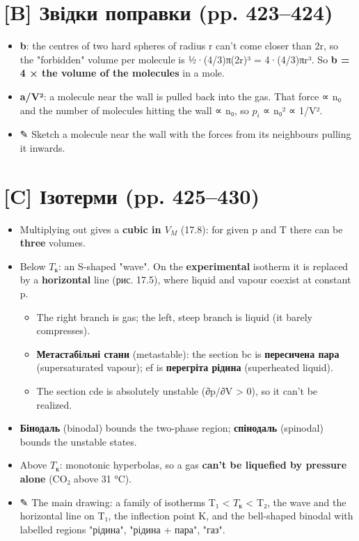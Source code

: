 \documentclass[11pt,a4paper,oneside]{book}
\newcommand{\pen}{{\sffamily\color{accent}✎}}
\begin{document}
\section*{[B] Звідки поправки (pp. 423–424)}
\begin{itemize}
\item \textbf{b}: the centres of two hard spheres of radius r can't come closer than 2r, so the "forbidden" volume per molecule is ½·(4/3)π(2r)³ = 4·(4/3)πr³. So \textbf{b = 4 × the volume of the molecules} in a mole.
\item \textbf{a/V²}: a molecule near the wall is pulled back into the gas. That force ∝ n₀ and the number of molecules hitting the wall ∝ n₀, so $p_{i}$ ∝ n₀² ∝ 1/V².
\item \pen{} Sketch a molecule near the wall with the forces from its neighbours pulling it inwards.
\end{itemize}

\section*{[C] Ізотерми (pp. 425–430)}
\begin{itemize}
\item Multiplying out gives a \textbf{cubic in $V_{M}$} (17.8): for given p and T there can be \textbf{three} volumes.
\item Below $T_{\text{к}}$: an S-shaped "wave". On the \textbf{experimental} isotherm it is replaced by a \textbf{horizontal} line (рис. 17.5), where liquid and vapour coexist at constant p.
\begin{itemize}
\item The right branch is gas; the left, steep branch is liquid (it barely compresses).
\item \textbf{Метастабільні стани} (metastable): the section bc is \textbf{пересичена пара} (supersaturated vapour); ef is \textbf{перегріта рідина} (superheated liquid).
\item The section cde is absolutely unstable (∂p/∂V > 0), so it can't be realized.
\end{itemize}
\item \textbf{Бінодаль} (binodal) bounds the two-phase region; \textbf{спінодаль} (spinodal) bounds the unstable states.
\item Above $T_{\text{к}}$: monotonic hyperbolas, so a gas \textbf{can't be liquefied by pressure alone} (CO₂ above 31 °C).
\item \pen{} The main drawing: a family of isotherms T₁ < $T_{\text{к}}$ < T₂, the wave and the horizontal line on T₁, the inflection point K, and the bell-shaped binodal with labelled regions "рідина", "рідина + пара", "газ".
\end{itemize}
\end{document}
